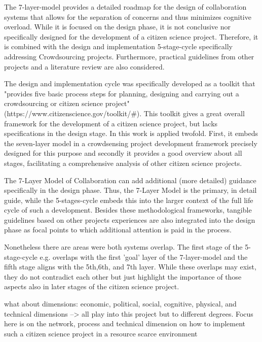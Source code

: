 The 7-layer-model provides a detailed roadmap for the design of collaboration systems that allows for the separation of concerns and thus minimizes cognitive overload. While it is focused on the design phase, it is not conclusive nor specifically designed for the development of a citizen science project. Therefore, it is combined with the design and implementation 5-stage-cycle specifically addressing Crowdsourcing projects. Furthermore, practical guidelines from other projects and a literature review are also considered.

The design and implementation cycle was specifically developed as a toolkit that "provides five basic process steps for planning, designing and carrying out a crowdsourcing or citizen science project" (https://www.citizenscience.gov/toolkit/#). This toolkit gives a great overall framework for the development of a citizen science project, but lacks specifications in the design stage. In this work is applied twofold. First, it embeds the seven-layer model in a crowdsensing project development framework precisely designed for this purpose and secondly it provides a good overview about all stages, facilitating a comprehensive analysis of other citizen science projects. 


The 7-Layer Model of Collaboration can add additional (more detailed) guidance specifically in the design phase. Thus, the 7-Layer Model is the primary, in detail guide, while the 5-stages-cycle embeds this into the larger context of the full life cycle of such a development.
Besides these methodological frameworks, tangible guidelines based on other projects experiences are also integrated into the design phase as focal points to which additional attention is paid in the process.

Nonetheless there are areas were both systems overlap. The first stage of the 5-stage-cycle e.g. overlaps with the first 'goal' layer of the 7-layer-model and the fifth stage aligns with the 5th,6th, and 7th layer. While these overlaps may exist, they do not contradict each other but just highlight the importance of those aspects also in later stages of the citizen science project.


what about dimensions: economic, political, social, cognitive, physical, and technical dimensions
--> all play into this project but to different degrees. Focus here is on the network, process and technical dimension on how to implement such a citizen science project in a resource scarce environment  

